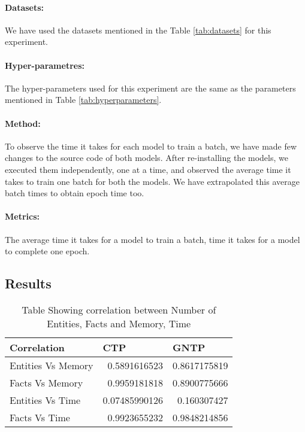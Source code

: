 \documentclass[Other]{iitddiss}
\begin{document}
\paragraph{Datasets:}
We have used the datasets mentioned in the Table \ref{tab:datasets} for this experiment.

\paragraph{Hyper-parametres:}
The hyper-parameters used for this experiment are the same as the parameters mentioned in Table \ref{tab:hyperparameters}.

\paragraph{Method: }
To observe the time it takes for each model to train a batch, we have made few changes to the source code of both models. After re-installing the models, we executed them independently, one at a time, and observed the average time it takes to train one batch for both the models. We have extrapolated this average batch times to obtain epoch time too.

\paragraph{Metrics:}
The average time it takes for a model to train a batch, time it takes for a model to complete one epoch.

\subsection{Results}

\begin{table}[H]
	\centering
	\begin{tabular}{|l|r|r|}
		\hline
		\textbf{Correlation} & \multicolumn{1}{l|}{\textbf{CTP}} & \multicolumn{1}{l|}{GNTP} \\ \hline
		Entities Vs Memory   & 0.5891616523                      & 0.8617175819              \\ \hline
		Facts Vs Memory      & 0.9959181818                      & 0.8900775666              \\ \hline
		Entities Vs Time     & 0.07485990126                     & 0.160307427               \\ \hline
		Facts Vs Time        & 0.9923655232                      & 0.9848214856              \\ \hline
		
	\end{tabular}
	\caption{Table Showing correlation between Number of Entities, Facts and Memory, Time}
	\label{tab:correlation}
\end{table}
\end{document}
